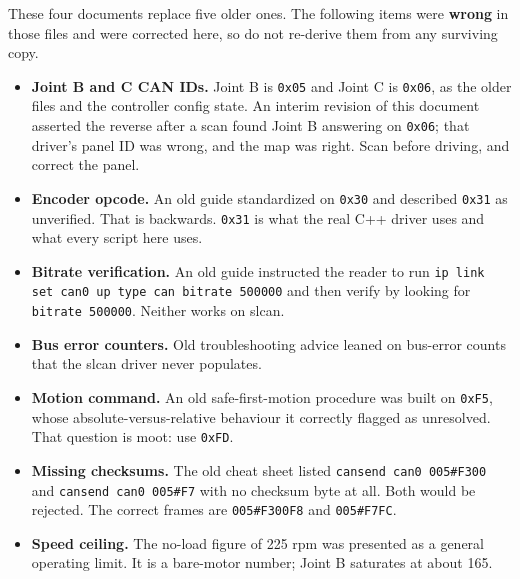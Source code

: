 \documentclass[11pt,letterpaper]{article}
\begin{document}
These four documents replace five older ones. The following items were
\textbf{wrong} in those files and were corrected here, so do not re-derive them from
any surviving copy.

\begin{itemize}[leftmargin=*]
    \item \textbf{Joint B and C CAN IDs.} Joint B is \texttt{0x05} and Joint C is
          \texttt{0x06}, as the older files and the controller config state. An
          interim revision of this document asserted the reverse after a scan found
          Joint B answering on \texttt{0x06}; that driver's panel ID was wrong, and
          the map was right. Scan before driving, and correct the panel.
    \item \textbf{Encoder opcode.} An old guide standardized on \texttt{0x30} and
          described \texttt{0x31} as unverified. That is backwards. \texttt{0x31} is
          what the real C++ driver uses and what every script here uses.
    \item \textbf{Bitrate verification.} An old guide instructed the reader to run
          \texttt{ip link set can0 up type can bitrate 500000} and then verify by
          looking for \texttt{bitrate 500000}. Neither works on slcan.
    \item \textbf{Bus error counters.} Old troubleshooting advice leaned on bus-error
          counts that the slcan driver never populates.
    \item \textbf{Motion command.} An old safe-first-motion procedure was built on
          \texttt{0xF5}, whose absolute-versus-relative behaviour it correctly
          flagged as unresolved. That question is moot: use \texttt{0xFD}.
    \item \textbf{Missing checksums.} The old cheat sheet listed
          \texttt{cansend can0 005\#F300} and \texttt{cansend can0 005\#F7} with no
          checksum byte at all. Both would be rejected. The correct frames are
          \texttt{005\#F300F8} and \texttt{005\#F7FC}.
    \item \textbf{Speed ceiling.} The no-load figure of 225 rpm was presented as a
          general operating limit. It is a bare-motor number; Joint B saturates at
          about 165.
\end{itemize}
\end{document}
